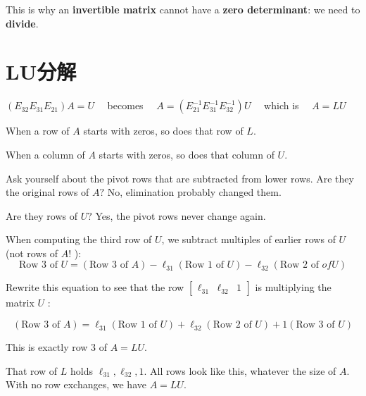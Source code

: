 \begin{example}
    This is why an \textbf{invertible matrix} cannot have a \textbf{zero determinant}: we need to \textbf{divide}.

\end{example}

\section{LU分解}

$ \left(E_{32} E_{31} E_{21}\right) A=U \quad $ becomes $ \quad A=\left(E_{21}^{-1} E_{31}^{-1} E_{32}^{-1}\right) U \quad $ which is $ \quad A=L U $

\begin{theorem}
    When a row of $A$ starts with zeros, so does that row of $L$.

    When a column of $A$ starts with zeros, so does that column of $U$.
\end{theorem}

\begin{example}
    Ask yourself about the pivot rows that are subtracted from lower rows. Are they the original rows of $ A ? $ No, elimination probably changed them.

    Are they rows of $ U ? $ Yes, the pivot rows never change again.

    When computing the third row of $ U $, we subtract multiples of earlier rows of $ U $ (not rows of $ A ! $ ):
    \begin{equation} \text{Row 3 of }  U=(\text{Row 3 of }  A)-\ell_{31}(
        \text{Row 1 of } U)-\ell_{32}(\text{Row 2 of }  of  U) \end{equation}

    Rewrite this equation to see that the row $ \left[\begin{array}{lll}\ell_{31} & \ell_{32} & 1\end{array}\right] $ is multiplying the matrix $ U $ :

    \begin{equation} (\text{Row 3 of } A)=\ell_{31}(\text{Row 1 of }  U)+\ell_{32}(\text{Row 2 of } U)+1(\text{Row 3 of }  U) \end{equation}

    This is exactly row 3 of $ A=L U . $

    That row of $
        L $ holds $ \ell_{31}, \ell_{32}, 1 . $ All rows look like this, whatever the size of $ A $. With no row exchanges, we have $ A=L U $.
\end{example}

